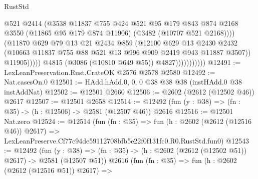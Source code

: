 \begin{lexlean}{RustStd}
\begin{coremodule}
                                    @521
                                    @2414
                                    (@3538
                                      @11837
                                      @755
                                      @424
                                      @521
                                      @95
                                      @179
                                      @843
                                      @874
                                      @2168
                                      @3550
                                      (@11865 @95 @179 @874 @11906)
                                      (@3482 (@10707 @521 @2168))))
                                  (@11870
                                    @629
                                    @79
                                    @13
                                    @21
                                    @2434
                                    @859
                                    (@12100
                                      @629
                                      @13
                                      @2430
                                      @2432
                                      (@10663
                                        @11837
                                        @755
                                        @88
                                        @521
                                        @13
                                        @996
                                        @909
                                        @2419
                                        @943
                                        @11887
                                        @3507))
                                    @11905)))))
                          @4815
                          (@3086 (@10810 @649 @55))
                          @4827)))))))))))
@12491 := LexLeanPreservation.Rust.CrateOK @2576 @2578 @2580
@12492 := Nat.casesOn.{0}
@12501 := HAdd.hAdd.{0, 0, 0} @38 @38 @38 (instHAdd.{0} @38 instAddNat)
@12502 := @12501 @2660
@12506 := @2602 (@2612 (@12502 @46)) @2617
@12507 := @12501 @2658
@12514 := @12492 (fun (y : @38) => (fn : @35) -> (h : @12506) -> @2581 (@12507 @46)) @2616
@12516 := @12501 Nat.zero
@12524 := @12514
    (fun (fn : @35) =>
    fun (h : @2602 (@2612 (@12516 @46)) @2617) =>
    LexLeanPreserve.Cf77c94de59112708bfb5e22f0f131fc0.R0.RustStd.fun0)
@12543 := @12492
    (fun (y : @38) => (fn : @35) -> (h : @2602 (@2612 (@12502 @51)) @2617) -> @2581 (@12507 @51))
    @2616
    (fun (fn : @35) =>
    fun (h : @2602 (@2612 (@12516 @51)) @2617) =>

\end{coremodule}
\end{lexlean}
